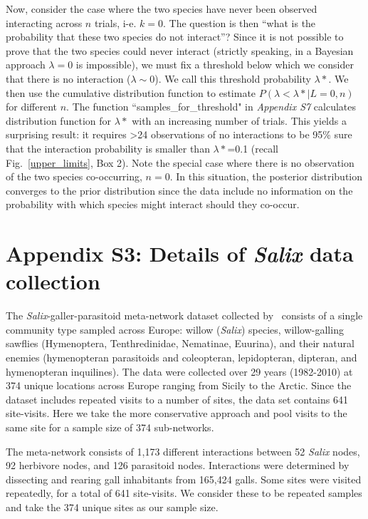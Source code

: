 \documentclass[12pt]{article}
\begin{document}
        Now, consider the case where the two species have never been observed interacting across $n$ trials, i-e. $k=0$. The question is then ``what is the probability that these two species do not interact''? Since it is not possible to prove that the two species could never interact (strictly speaking, in a Bayesian approach $\lambda=0$ is impossible), we must fix a threshold below which we consider that there is no interaction ($\lambda \sim 0$). We call this threshold probability $\lambda*$. We then use the cumulative distribution function to estimate $P(\lambda<\lambda*|L=0,n)$ for different $n$. The function ``samples\_for\_threshold" in \emph{Appendix S7} calculates distribution function for $\lambda*$ with an increasing number of trials. This yields a surprising result: it requires \textgreater24 observations of no interactions to be 95\% sure that the interaction probability is smaller than $\lambda*$=0.1 (recall Fig.~\ref{upper_limits}, Box 2). Note the special case where there is no observation of the two species co-occurring, $n = 0$.  In this situation, the posterior distribution converges to the prior distribution since the data include no information on the probability with which species might interact should they co-occur.

\clearpage

\section*{Appendix S3: Details of \emph{Salix} data collection}

      The \emph{Salix}-galler-parasitoid meta-network dataset collected 
      by~\citet{Kopelke2017} consists of a single community type sampled across 
      Europe: willow (\emph{Salix}) species, willow-galling sawflies (Hymenoptera, Tenthredinidae, Nematinae, Euurina), and their natural 
      enemies (hymenopteran parasitoids and coleopteran, lepidopteran, dipteran, 
      and hymenopteran inquilines). The data were collected over 29 years 
      (1982-2010) at 374 unique locations across Europe ranging from Sicily to 
      the Arctic. Since the dataset includes repeated visits to a number of sites, the data set 
      contains 641 site-visits. Here we take the more conservative approach and pool visits to the same site for a sample size of 374 sub-networks.

      The meta-network consists of 1,173 different interactions 
      between 52 \emph{Salix} nodes, 92 herbivore nodes, and 126 parasitoid 
      nodes. Interactions were determined by dissecting and rearing gall 
      inhabitants from 165,424 galls. Some sites were visited repeatedly, for a 
      total of 641 site-visits. We consider these to be repeated samples and 
      take the 374 unique sites as our sample size.
\end{document}
